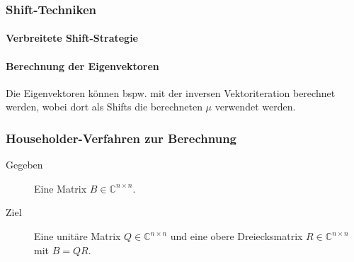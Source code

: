 \documentclass[a4paper, 11pt, accentcolor = tud3b]{tudreport}
\newcommand{\C}{\ensuremath{\mathbb{C}}}
\begin{document}
	            \subsubsection{Shift-Techniken}
	
	                \paragraph{Verbreitete Shift-Strategie}
	
	                \paragraph{Berechnung der Eigenvektoren}
		                Die Eigenvektoren können bspw. mit der inversen Vektoriteration berechnet werden, wobei dort als Shifts die berechneten \(\mu\) verwendet werden.
	
	            \subsubsection{Householder-Verfahren zur Berechnung}
		            \label{sec:householder}
		            
	                \begin{description}
	                	\item[Gegeben] Eine Matrix \( B \in \C^{n \times n} \).
	                	\item[Ziel] Eine unitäre Matrix \( Q \in \C^{n \times n} \) und eine obere Dreiecksmatrix \( R \in \C^{n \times n} \) mit \( B = QR \).
	                \end{description}
                
\end{document}
